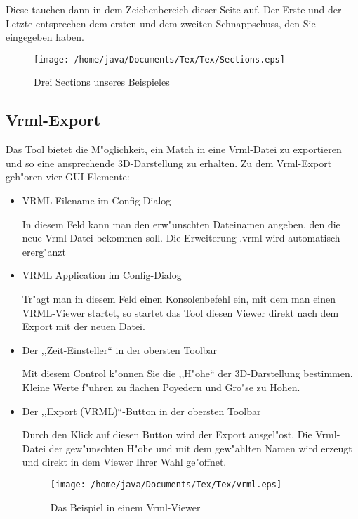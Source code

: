Diese tauchen dann in dem Zeichenbereich dieser Seite auf. Der Erste und der Letzte entsprechen dem ersten und dem zweiten Schnappschuss, den Sie eingegeben haben.
\begin{figure}
   \centering
   \texttt{[image: /home/java/Documents/Tex/Tex/Sections.eps]}
   \caption{Drei Sections unseres Beispieles}
   \label{fig:Sections}
\end{figure}
\subsection{Vrml-Export}
Das Tool bietet die M"oglichkeit, ein Match in eine Vrml-Datei zu exportieren und so eine ansprechende 3D-Darstellung zu erhalten. Zu dem Vrml-Export geh"oren vier GUI-Elemente:
\begin{itemize}
\item VRML Filename im Config-Dialog

 In diesem Feld kann man den erw"unschten Dateinamen angeben, den die neue Vrml-Datei bekommen soll. Die Erweiterung .vrml wird automatisch ererg"anzt
\item VRML Application im Config-Dialog

Tr"agt man in diesem Feld einen Konsolenbefehl ein, mit dem man einen VRML-Viewer startet, so startet das Tool diesen Viewer direkt nach dem Export mit der neuen Datei.

\item Der ,,Zeit-Einsteller`` in der obersten Toolbar

Mit diesem Control k"onnen Sie die ,,H"ohe`` der 3D-Darstellung bestimmen. Kleine Werte f"uhren zu flachen Poyedern und Gro"se zu Hohen.
\item Der ,,Export (VRML)``-Button in der obersten Toolbar

Durch den Klick auf diesen Button wird der Export ausgel"ost. Die Vrml-Datei der gew"unschten H"ohe und mit dem gew"ahlten Namen wird erzeugt und direkt in dem Viewer Ihrer Wahl ge"offnet.
\begin{figure}
   \centering
   \texttt{[image: /home/java/Documents/Tex/Tex/vrml.eps]}
   \caption{Das Beispiel in einem Vrml-Viewer}
   \label{fig:vrml}
\end{figure}
\end{itemize}
